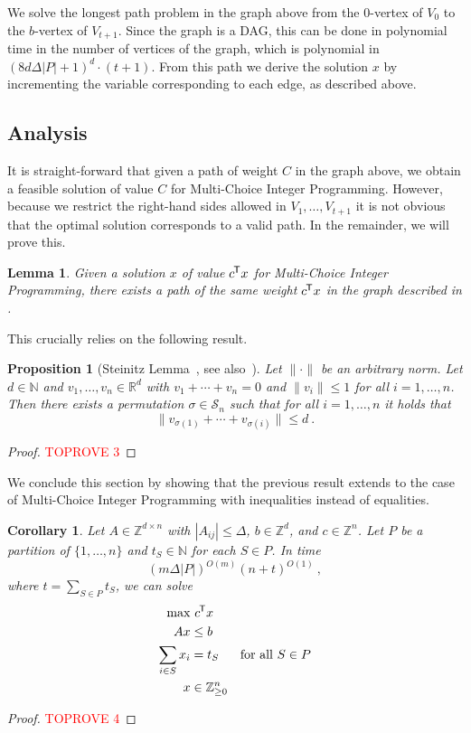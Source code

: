 \documentclass{article}
\newcommand*{\T}{^{\mkern-1.5mu\mathsf{T}}}
\newcommand{\N}{\mathbb{N}}
\newcommand{\Z}{\mathbb{Z}}
\newcommand{\ZZ}{\Z_{\ge 0}}
\newcommand{\R}{\mathbb{R}}
\newtheorem{lemma}[theorem]{Lemma}
\newtheorem{proposition}[theorem]{Proposition}
\newtheorem{corollary}[theorem]{Corollary}
\begin{document}
We solve the longest path problem in the graph above from the $0$-vertex of $V_0$ to the $b$-vertex of $V_{t+1}$.
Since the graph is a DAG, this can be done in polynomial time in the number of vertices of the graph, which
is polynomial in $(8 d\Delta |P| + 1)^d \cdot (t+1)$.
From this path we derive the solution $x$ by incrementing the variable corresponding to each edge, as described above.

\subsection{Analysis}
It is straight-forward that given a path of weight $C$ in the graph above, we obtain a feasible solution
of value $C$ for Multi-Choice Integer Programming.
However, because we restrict the right-hand sides allowed in $V_1,\dotsc,V_{t+1}$
it is not obvious that the optimal solution corresponds to a valid path.
In the remainder, we will prove this.
\begin{lemma}\label{lem:steinitz-path}
Given a solution $x$ of value $c\T x$ for Multi-Choice Integer Programming, there exists a path of 
	the same weight $c\T x$ in the graph described in .
\end{lemma}
This crucially relies on the following result.
\begin{proposition}[Steinitz Lemma~\cite{sevast1978approximate}, see also~\cite{eisenbrand2019proximity}]
	Let $\| \cdot \|$ be an arbitrary norm.
	Let $d\in\N$ and $v_1,\dotsc,v_n\in \R^d$ with $v_1 + \cdots + v_n = 0$ and $\| v_i \| \le 1$ for all $i=1,\dotsc,n$.
	Then there exists a permutation $\sigma \in \mathcal S_n$ such that for all $i = 1,\dotsc,n$ it holds that
	\begin{equation*}
		\| v_{\sigma(1)} + \cdots + v_{\sigma(i)} \| \le d \ .
	\end{equation*}
\end{proposition}
\begin{proof}\textcolor{red}{TOPROVE 3}\end{proof}

We conclude this section by showing that the previous result extends to the case of Multi-Choice Integer
Programming with inequalities instead of equalities.
\begin{corollary}\label{cor:ilp2}
	Let $A\in \Z^{d\times n}$ with $|A_{ij}| \le \Delta$, $b\in \Z^d$, and $c\in\Z^n$.
	Let $P$ be a partition of $\{1,\dotsc,n\}$ and $t_S\in\N$ for each $S\in P$.
	In time
	\begin{equation*}
		(m \Delta |P|)^{O(m)} (n + t)^{O(1)} \ ,
	\end{equation*}
	where $t = \sum_{S\in P} t_S$, we can solve
	\begin{align*}
		\max &\ c\T x \\
		A x &\le b \\
		\sum_{i\in S} x_i &= t_S &\text{\rm for all } S\in P \\
		x &\in \ZZ^n 
	\end{align*}
\end{corollary}
\begin{proof}\textcolor{red}{TOPROVE 4}\end{proof}
\end{document}

